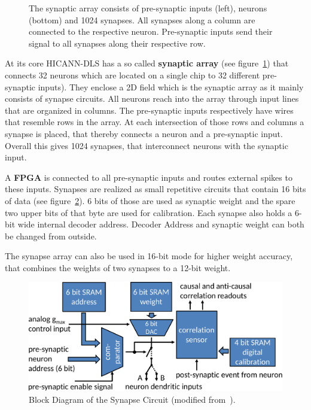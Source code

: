 \begin{figure}[h!]
    \centering
    
    \caption{\label{fig:array} The synaptic array consists of pre-synaptic inputs (left), neurons (bottom) and 1024 synapses. All synapses along a column are connected to the respective neuron. Pre-synaptic inputs send their signal to all synapses along their respective row.}
\end{figure}
At its core \ac{HICANN-DLS} has a so called \textbf{synaptic array} (see figure~\ref{fig:array}) that connects 32 neurons which are located on a single chip to 32 different pre-synaptic inputs).
They enclose a 2D field which is the synaptic array as it mainly consists of synapse circuits.
All neurons reach into the array through input lines that are organized in columns.
The pre-synaptic inputs respectively have wires that resemble rows in the array.
At each intersection of those rows and columns a synapse is placed, that thereby connects a neuron and a pre-synaptic input.
Overall this gives 1024 synapses, that interconnect neurons with the synaptic input.

A \textbf{\ac{FPGA}} is connected to all pre-synaptic inputs and routes external spikes to these inputs.
Synapses are realized as small repetitive circuits that contain 16 bits of data (see figure~\ref{fig:circuit}).
6 bits of those are used as synaptic weight and the spare two upper bits of that byte are used for calibration.
Each synapse also holds a 6-bit wide internal decoder address.
Decoder Address and synaptic weight can both be changed from outside.

The synapse array can also be used in 16-bit mode for higher weight accuracy, that combines the weights of two synapses to a 12-bit weight.
\begin{figure}[htbp]
    \centering
    \includegraphics[width=\textwidth]{pictures/syncircuit.pdf}
    \caption{\label{fig:circuit} Block Diagram of the Synapse Circuit (modified from~\citeauthor{PPU}).}
\end{figure}

